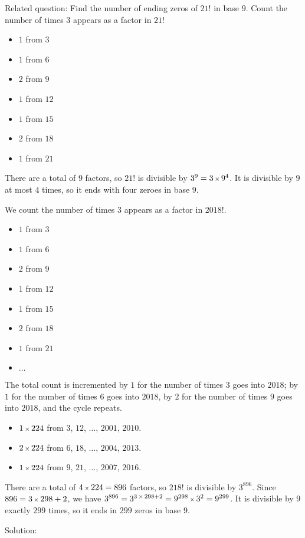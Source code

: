 
\begin{boxinbox}{Related question:}
Find the number of ending zeros of $21!$ in base $9$. 
Count the number of times $3$ appears as a factor in $21!$
\begin{itemize}[label={}]
\item $1$ from $3$
\item $1$ from $6$
\item $2$ from $9$
\item $1$ from $12$
\item $1$ from $15$
\item $2$ from $18$
\item $1$ from $21$
\end{itemize}
There are a total of $9$ factors, so $21!$ is divisible by $3^9=3 \operatorname{\mbox{\scriptsize$\times$}} 9^4$. It is divisible by $9$ at most $4$ times, so it ends with four zeroes in base $9$.
\end{boxinbox}

We count the number of times $3$ appears as a factor in $2018!$.
\begin{itemize}[label={}]
\item $1$ from $3$
\item $1$ from $6$
\item $2$ from $9$
\item $1$ from $12$
\item $1$ from $15$
\item $2$ from $18$
\item $1$ from $21$
\item $\ldots$
\end{itemize}
The total count is incremented by $1$ for the number of times $3$ goes into $2018$; by $1$ for the number of times $6$ goes into $2018$, by $2$ for the number of times $9$ goes into $2018$, and the cycle repeats.
\begin{itemize}[label={}]
\item $1 \operatorname{\mbox{\scriptsize$\times$}} 224$ from $3$, $12$, $\ldots$, $2001$, $2010$.
\item $2 \operatorname{\mbox{\scriptsize$\times$}} 224$ from $6$, $18$, $\ldots$, $2004$, $2013$.
\item $1 \operatorname{\mbox{\scriptsize$\times$}} 224$ from $9$, $21$, $\ldots$, $2007$, $2016$.
\end{itemize}
There are a total of $4 \operatorname{\mbox{\scriptsize$\times$}} 224 = 896$ factors, so $218!$ is divisible by $3^{896}$. Since $896=3\operatorname{\mbox{\scriptsize$\times$}}298+2$, we have $3^{896}=3^{3\operatorname{\mbox{\scriptsize$\times$}}298+2}=9^{298}\operatorname{\mbox{\scriptsize$\times$}}3^{2}=9^{299}$. It is divisible by $9$ exactly $299$ times, so it ends in $299$ zeros in base $9$.

Solution: 




